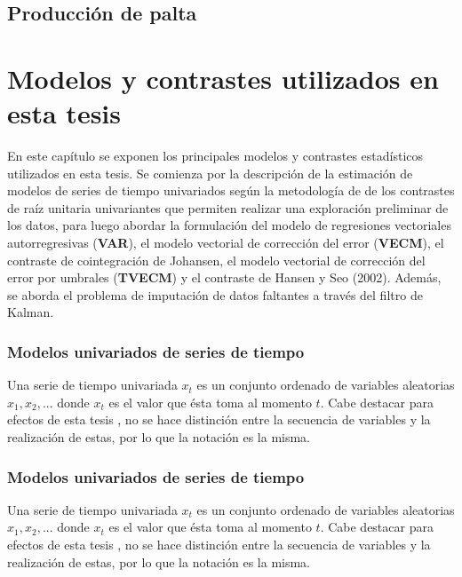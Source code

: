\documentclass[12pt, twoside]{book}\usepackage[]{graphicx}\usepackage[]{color}
\numberwithin{equation}{section}
\numberwithin{theorem}{section}
\numberwithin{teorema}{section}
\numberwithin{defi}{section}
\numberwithin{prop}{section}
\numberwithin{defi}{section}
\theoremstyle{plain}
\begin{document}
\section{Producción de palta} 






\chapter{Modelos y contrastes utilizados en esta tesis}

En este capítulo se exponen los principales modelos y contrastes estadísticos utilizados en esta tesis. Se comienza por la descripción de la estimación de modelos de series de tiempo univariados según la metodología de de los contrastes de raíz unitaria univariantes que permiten realizar una exploración preliminar de los datos, para luego abordar la formulación del modelo de regresiones vectoriales autorregresivas (\textbf{VAR}), el modelo vectorial de corrección del error (\textbf{VECM}), el contraste de cointegración de Johansen, el modelo vectorial de corrección del error por umbrales (\textbf{TVECM}) y el contraste de Hansen y Seo (2002). Además, se aborda el problema de imputación de datos faltantes a través del filtro de Kalman. 


\subsection{Modelos univariados de series de tiempo}

Una serie de tiempo univariada $x_{t}$ es un conjunto ordenado de variables aleatorias $x_{1},x_{2},...$ donde $x_{t}$ es el valor que ésta toma al momento $t$. Cabe destacar para efectos de esta tesis , no se hace distinción entre la secuencia de variables y la realización de estas, por lo que la notación es la misma. 



\subsection{Modelos univariados de series de tiempo}

Una serie de tiempo univariada $x_{t}$ es un conjunto ordenado de variables aleatorias $x_{1},x_{2},...$ donde $x_{t}$ es el valor que ésta toma al momento $t$. Cabe destacar para efectos de esta tesis , no se hace distinción entre la secuencia de variables y la realización de estas, por lo que la notación es la misma. 
\end{document}
